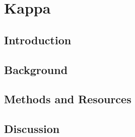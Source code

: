 \part{Kappa} 
\label{part:kappa}


\chapter{Introduction}
\label{chapter:introduction}


\chapter{Background}
\label{chapter:background}
%

\chapter{Methods and Resources}
\label{chapter:methods}
%

\chapter{Discussion}
\label{chapter:discussion}
%